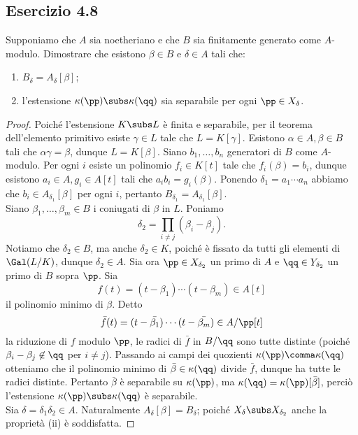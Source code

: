 \documentclass[a4paper]{article}
\begin{document}
\subsection*{Esercizio 4.8}
Supponiamo che $A$ sia noetheriano e che $B$ sia finitamente generato come $A$-modulo. Dimostrare che esistono $\beta\in B$ e $\delta\in A$ tali che:
\begin{enumerate}
\item $B_\delta=A_\delta[\beta]$;
\item l'estensione $\kappa(\pp)\subs\kappa(\qq)$ sia separabile per ogni $\pp\in X_\delta$.
\end{enumerate}
\begin{proof}
Poiché l'estensione $K\subs L$ è finita e separabile, per il teorema dell'elemento primitivo esiste $\gamma\in L$ tale che $L=K[\gamma]$. Esistono $\alpha\in A,\beta\in B$ tali che $\alpha\gamma=\beta$, dunque $L=K[\beta]$. Siano $b_1,\ldots,b_n$ generatori di $B$ come $A$-modulo. Per ogni $i$ esiste un polinomio $f_i\in K[t]$ tale che $f_i(\beta)=b_i$, dunque esistono $a_i\in A\comma g_i\in A[t]$ tali che $a_ib_i=g_i(\beta)$. Ponendo $\delta_1=a_1\cdots a_n$ abbiamo che $b_i\in A_{\delta_1}[\beta]$ per ogni $i$, pertanto $B_{\delta_1}=A_{\delta_1}[\beta]$.\\
Siano $\beta_1,\ldots,\beta_m\in B$ i coniugati di $\beta$ in $L$. Poniamo
$$
\delta_2=\prod_{i\neq j}(\beta_i-\beta_j).
$$
Notiamo che $\delta_2\in B$, ma anche $\delta_2\in K$, poiché è fissato da tutti gli elementi di $\Gal(L/K)$, dunque $\delta_2\in A$. Sia ora $\pp\in X_{\delta_2}$ un primo di $A$ e $\qq\in Y_{\delta_2}$ un primo di $B$ sopra $\pp$. Sia
$$
f(t)=(t-\beta_1)\cdots(t-\beta_m)\in A[t]
$$
il polinomio minimo di $\beta$. Detto
$$
\bar{f}(t)=(t-\bar{\beta_1})\cdots(t-\bar{\beta_m})\in A/\pp[t]
$$
la riduzione di $f$ modulo $\pp$, le radici di $\bar{f}$ in $B/\qq$ sono tutte distinte (poiché $\beta_i-\beta_j\not\in\qq$ per $i\neq j$). Passando ai campi dei quozienti $\kappa(\pp)\comma\kappa(\qq)$ otteniamo che il polinomio minimo di $\bar{\beta}\in\kappa(\qq)$ divide $\bar{f}$, dunque ha tutte le radici distinte. Pertanto $\bar{\beta}$ è separabile su $\kappa(\pp)$, ma $\kappa(\qq)=\kappa(\pp)[\bar{\beta}]$, perciò l'estensione $\kappa(\pp)\subs\kappa(\qq)$ è separabile.\\
Sia $\delta=\delta_1\delta_2\in A$. Naturalmente $A_\delta[\beta]=B_\delta$; poiché $X_\delta\subs X_{\delta_2}$ anche la proprietà (ii) è soddisfatta.
\end{proof}
\end{document}
